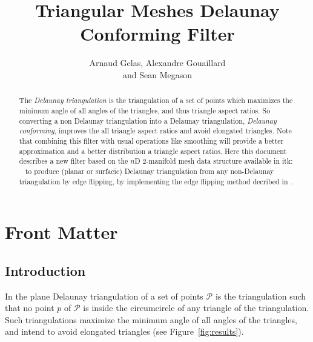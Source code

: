 \documentclass{InsightArticle}
\title{Triangular Meshes Delaunay Conforming Filter}
\author{Arnaud Gelas, Alexandre Gouaillard\\
and Sean Megason}
\begin{document}
\ifpdf
\else
\fi


\maketitle


\ifhtml
\chapter*{Front Matter\label{front}}
\fi


\begin{abstract}
\noindent
The \emph{Delaunay triangulation} is the triangulation of a set of points which maximizes the minimum angle of all angles of the triangles, and thus triangle aspect ratios. So converting a non Delaunay triangulation into a Delaunay triangulation, \emph{Delaunay conforming}, improves the all triangle aspect ratios and avoid elongated triangles. Note that combining this filter with usual operations like smoothing will provide a better approximation and a better distribution a triangle aspect ratios. Here this document describes a new filter based on the $n$D $2$-manifold mesh data structure available in itk: ~\cite{itkQE} to produce (planar or surfacic) Delaunay triangulation from any non-Delaunay triangulation by edge flipping, by implementing the edge flipping method decribed in~\cite{Dyer2007sgp}. 
\end{abstract}

\tableofcontents

\section{Introduction}
In the plane Delaunay triangulation of a set of points $\mathcal{P}$ is the triangulation such that no point $p$ of $\mathcal{P}$ is inside the circumcircle of any triangle of the triangulation. Such triangulations maximize the minimum angle of all angles of the triangles, and intend to avoid elongated triangles (see Figure~\ref{fig:results}).
\end{document}
